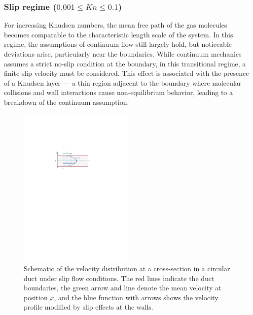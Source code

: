 \subsubsection*{Slip regime (\(0.001 \leq Kn \leq 0.1\))}
	For increasing Knudsen numbers, the mean free path of the gas molecules becomes comparable to the characteristic length scale of the system.
	In this regime, the assumptions of continuum flow still largely hold, but noticeable deviations arise, particularly near the boundaries.
	While continuum mechanics assumes a strict no-slip condition at the boundary, in this transitional regime, a finite slip velocity must be considered.
	This effect is associated with the presence of a Knudsen layer — a thin region adjacent to the boundary where molecular collisions and wall interactions cause non-equilibrium behavior, leading to a breakdown of the continuum assumption.
	\begin{figure}[H]
	    \centering
	    \includegraphics[width=0.5\textwidth]{src/02_foundations/fig_slip-regime.pdf}
		\caption{
			Schematic of the velocity distribution at a cross-section in a circular duct under slip flow conditions.
			The red lines indicate the duct boundaries, the green arrow and line denote the mean velocity at position $x$, and the blue function with arrows shows the velocity profile modified by slip effects at the walls. \cite{Cengel2017}
		}
		\label{fig:slip-flow}
	\end{figure}

